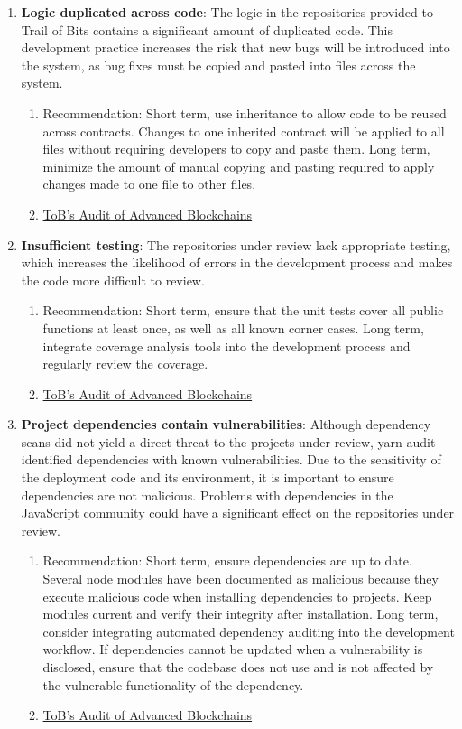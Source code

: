 \begin{enumerate}
\item\textbf{Logic duplicated across code}: The logic in the repositories provided to Trail of Bits contains a significant amount of duplicated code. This development practice increases the risk that new bugs will be introduced into the system, as bug fixes must be copied and pasted into files across the system.
	\begin{enumerate}
	\item Recommendation: Short term, use inheritance to allow code to be reused across contracts. Changes to one inherited contract will be applied to all files without requiring developers to copy and paste them. Long term, minimize the amount of manual copying and pasting required to apply changes made to one file to other files.
	\item\href{https://github.com/trailofbits/publications/blob/master/reviews/AdvancedBlockchain.pdf}{ToB's Audit of Advanced Blockchains}
	\end{enumerate}

\item\textbf{Insufficient testing}: The repositories under review lack appropriate testing, which increases the likelihood of errors in the development process and makes the code more difficult to review.
	\begin{enumerate}
	\item Recommendation: Short term, ensure that the unit tests cover all public functions at least once, as well as all known corner cases. Long term, integrate coverage analysis tools into the development process and regularly review the coverage.
	\item\href{https://github.com/trailofbits/publications/blob/master/reviews/AdvancedBlockchain.pdf}{ToB's Audit of Advanced Blockchains}
	\end{enumerate}

\item\textbf{Project dependencies contain vulnerabilities}: Although dependency scans did not yield a direct threat to the projects under review, yarn audit identified dependencies with known vulnerabilities. Due to the sensitivity of the deployment code and its environment, it is important to ensure dependencies are not malicious. Problems with dependencies in the JavaScript community could have a significant effect on the repositories under review.
	\begin{enumerate}
	\item Recommendation: Short term, ensure dependencies are up to date. Several node modules have been documented as malicious because they execute malicious code when installing dependencies to projects. Keep modules current and verify their integrity after installation. Long term, consider integrating automated dependency auditing into the development workflow. If dependencies cannot be updated when a vulnerability is disclosed, ensure that the codebase does not use and is not affected by the vulnerable functionality of the dependency.
	\item\href{https://github.com/trailofbits/publications/blob/master/reviews/AdvancedBlockchain.pdf}{ToB's Audit of Advanced Blockchains}
	\end{enumerate}


\end{enumerate}
